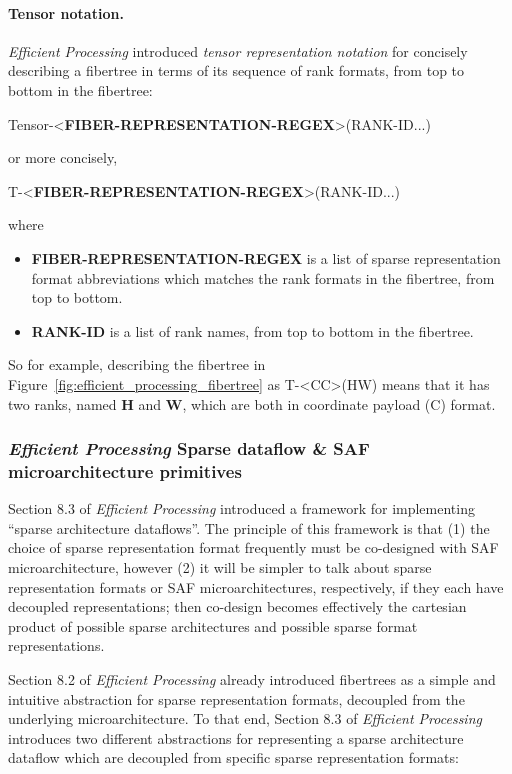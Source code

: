 \paragraph{Tensor notation.} \textit{Efficient Processing} introduced \textit{tensor representation notation}\cite{szebook} for concisely describing a fibertree in terms of its sequence of rank formats, from top to bottom in the fibertree:

Tensor-<\textbf{FIBER-REPRESENTATION-REGEX}>(RANK-ID...)

or more concisely,

T-<\textbf{FIBER-REPRESENTATION-REGEX}>(RANK-ID...)

where

\begin{itemize}
    \item \textbf{FIBER-REPRESENTATION-REGEX} is a list of sparse representation format abbreviations which matches the rank formats in the fibertree, from top to bottom.
    \item \textbf{RANK-ID} is a list of rank names, from top to bottom in the fibertree.
\end{itemize}

So for example, describing the fibertree in Figure~\ref{fig:efficient_processing_fibertree} as T-<CC>(HW) means that it has two ranks, named \textbf{H} and \textbf{W}, which are both in coordinate payload (C) format.

\subsubsection{\textit{Efficient Processing} Sparse dataflow \& SAF microarchitecture primitives}

Section 8.3 of \textit{Efficient Processing} introduced a framework for implementing ``sparse architecture dataflows''. The principle of this framework is that (1) the choice of sparse representation format frequently must be co-designed with SAF microarchitecture, however (2) it will be simpler to talk about sparse representation formats or SAF microarchitectures, respectively, if they each have decoupled representations; then co-design becomes effectively the cartesian product of possible sparse architectures and possible sparse format representations. 

Section 8.2 of \textit{Efficient Processing} already introduced fibertrees as a simple and intuitive abstraction for sparse representation formats, decoupled from the underlying microarchitecture. To that end, Section 8.3 of \textit{Efficient Processing} introduces two different abstractions for representing a sparse architecture dataflow which are decoupled from specific sparse representation formats:

